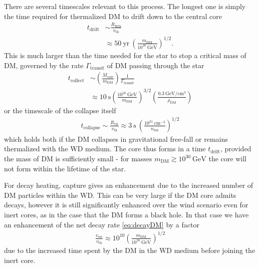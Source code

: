\documentclass[twocolumn, preprintnumbers,amsmath,amssymb,prd, superscriptaddress]{revtex4}
\newcommand{\GeV}{\text{GeV}}
\newcommand{\cm}{\text{cm}}
\def\r{\right)}
\def\l{\left(}
\begin{document}
There are several timescales relevant to this process.
The longest one is simply the time required for thermalized DM to drift down to the central core
\begin{align}
\label{eq:tdrift}
  t_\text{drift} &\sim \frac{R_\text{WD}}{v_\text{th}} \\
  &\approx 50 ~\text{yr} ~ \l \frac{m_\text{DM}}{10^{16} ~\GeV} \r^{1/2}. \nonumber
\end{align}
This is much larger than the time needed for the star to stop a critical mass of DM, governed by the rate $\Gamma_\text{transit}$ of DM passing through the star
\begin{align}
\label{eq:tcol}
  t_\text{collect} &\sim \l \frac{M_\text{core}}{m_\text{DM}}\r \frac{1}{\Gamma_\text{transit}} \\
  & \approx 10 ~\text{s} \l \frac{10^{16} ~\GeV}{m_\text{DM}} \r^{3/2} \l \frac{0.3 ~\GeV/\text{cm}^3}{\rho_\text{DM}} \r \nonumber
\end{align}
or the timescale of the collapse itself
\begin{align}
  t_\text{collapse} \sim \frac{R_\text{vir}}{v_\text{th}}
  \approx 3 ~\text{s} ~ \l \frac{10^{31} ~\cm^{-3}}{n_\text{ion}}\r^{1/2}
\end{align}
which holds both if the DM collapses in gravitational free-fall or remains thermalized with the WD medium.
The core thus forms in a time $t_\text{drift}$, provided the mass of DM is sufficiently small - for masses $m_\text{DM} \gtrsim 10^{30}~\GeV$ the core will not form within the lifetime of the star.

For decay heating, capture gives an enhancement due to the increased number of DM particles within the WD.
This can be very large if the DM core admits decays, however it is still significantly enhanced over the wind scenario even for inert cores, as in the case that the DM forms a black hole.
In that case we have an enhancement of the net decay rate \eqref{eq:decayDM} by a factor
\begin{align}
  \frac{v_\text{esc}}{v_\text{th}}
  \approx 10^{10} \l \frac{m_\text{DM}}{10^{16}~\GeV} \r^{1/2}
\end{align}
due to the increased time spent by the DM in the WD medium before joining the inert core.
\end{document}
